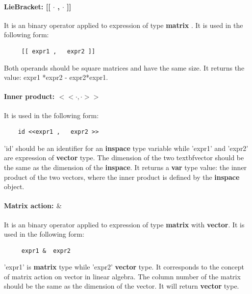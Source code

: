 \documentclass[12pt]{article} %
\begin{document}
\paragraph{LieBracket: [[ $\cdot$ ,  $\cdot$ ]] }
It is an binary operator applied to expression of type \textbf{matrix} . It is used in the following form:
\begin{lstlisting}
     [[ expr1 ,   expr2 ]]
\end{lstlisting}
Both operands should be square matrices and have the same size. It returns the value: expr1 *expr2 - expr2*expr1.
\paragraph{ Inner product:  $<<  \cdot ,  \cdot >>  $}
It is used in the following form:
\begin{lstlisting}
    id <<expr1 ,   expr2 >>
\end{lstlisting}
'id' should be an identifier for an \textbf{inspace} type variable while 'expr1' and 'expr2'  are expression of  \textbf{vector} type. The dimension of the two textbf{vector} should be the same as the dimension of the \textbf{inspace}. It returns a  \textbf{var} type value: the  inner product of the two vectors, where the inner product is defined by the   \textbf{inspace} object.

\paragraph{ Matrix action: $\&$ }
It is an binary operator applied to expression of type \textbf{matrix}  with  \textbf{vector}. It is used in the following form:
\begin{lstlisting}
     expr1 &  expr2
\end{lstlisting}
'expr1' is \textbf{matrix} type while 'expr2' \textbf{vector} type.  It corresponds to the concept of matrix action on vector in linear algebra.   The column number of the matrix should be the same as the dimension of the vector. It will return \textbf{vector} type.
\end{document}
